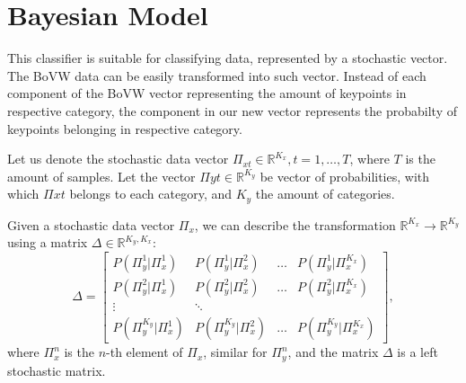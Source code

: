 \section{Bayesian Model}
This classifier is suitable for classifying data, represented by a stochastic vector. The BoVW data can be easily transformed into such vector. Instead of each component of the BoVW vector representing the amount of keypoints in respective category, the component in our new vector represents the probabilty of keypoints belonging in respective category.

Let us denote the stochastic data vector $\Pi_{xt} \in \mathbb{R}^{K_x}, t=1,\dots,T$, where $T$ is the amount of samples. Let the vector $\Pi{yt}\in \mathbb{R}^{K_y}$ be vector of probabilities, with which $\Pi{xt}$ belongs to each category, and $K_y$ the amount of categories.

Given a stochastic data vector $\Pi_x$, we can describe the transformation $\mathbb{R}^{K_x} \rightarrow \mathbb{R}^{K_y}$ using a matrix $\Delta \in \mathbb{R}^{K_y, K_x}$:
\begin{equation}
    \Delta =
    \begin{bmatrix}
        P(\Pi_y^1 | \Pi_x^1) & P(\Pi_y^1 | \Pi_x^2) & \dots & P(\Pi_y^1 | \Pi_x^{K_x})\\
        P(\Pi_y^2 | \Pi_x^1) & P(\Pi_y^2 | \Pi_x^2) & \dots & P(\Pi_y^2 | \Pi_x^{K_x})\\
        \vdots & \ddots\\
        P(\Pi_y^{K_y} | \Pi_x^1) & P(\Pi_y^{K_y} | \Pi_x^2) & \dots & P(\Pi_y^{K_y} | \Pi_x^{K_x})
    \end{bmatrix},
\end{equation}
where $\Pi_x^n$ is the $n$-th element of $\Pi_x$, similar for $\Pi_y^n$, and the matrix $\Delta$ is a left stochastic matrix.


